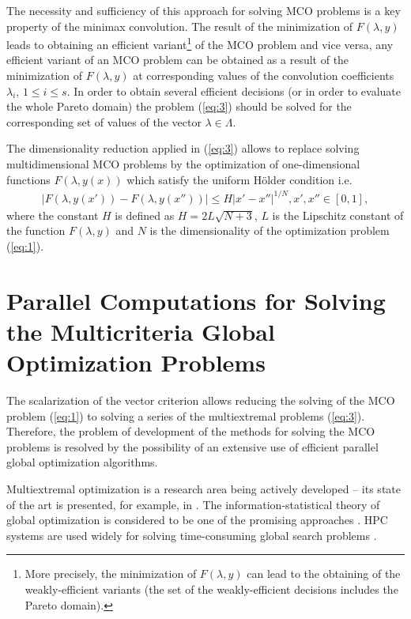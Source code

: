\documentclass[runningheads]{llncs}
\begin{document}
The necessity and sufficiency of this approach for solving MCO problems is a key property of the minimax convolution. The result of the minimization of $F(\lambda,y)$ leads to obtaining an efficient variant\footnote{More precisely, the minimization of $F(\lambda,y)$ can lead to the obtaining of the weakly-efficient variants (the set of the weakly-efficient decisions includes the Pareto domain).} of the MCO problem and vice versa, any efficient variant of an MCO problem can be obtained as a result of the minimization of $F(\lambda,y)$ at corresponding values of the convolution coefficients $\lambda_i$, $1 \leq i \leq s$. In order to obtain several efficient decisions (or in order to evaluate the whole Pareto domain) the problem (\ref{eq:3}) should be solved for the corresponding set of values of the vector $\lambda \in \Lambda$.

The dimensionality reduction applied in (\ref{eq:3}) allows to replace solving multidimensional MCO problems by the optimization of one-dimensional functions $F(\lambda,y(x))$ which satisfy the uniform H\"{o}lder condition i.e.
\begin{eqnarray} \label{eq:04}
|F(\lambda, y(x')) - F(\lambda, y(x''))| \leq H |x' - x''|^{1/N}, x', x'' \in [0,1], 
\end{eqnarray}
where the constant $H$ is defined as $H=2L\sqrt{N+3}$, $L$ is the Lipschitz constant of the function $F(\lambda,y)$ and $N$ is the dimensionality of the optimization problem (\ref{eq:1}).

\section{Parallel Computations for Solving the Multicriteria Global Optimization Problems}
\label{sec:3}
The scalarization of the vector criterion allows reducing the solving of the MCO problem (\ref{eq:1}) to solving a series of the multiextremal problems (\ref{eq:3}). Therefore, the problem of development of the methods for solving the MCO problems is resolved by the possibility of an extensive use of efficient parallel global optimization algorithms.

Multiextremal optimization is a research area being actively developed -- its state of the art is presented, for example, in \cite{c7,c9,c10,c60}. The information-statistical theory of global optimization is considered to be one of the promising approaches \cite{c7}. HPC systems are used widely for solving time-consuming global search problems \cite{c7,c11,c14,c15}.
\end{document}
